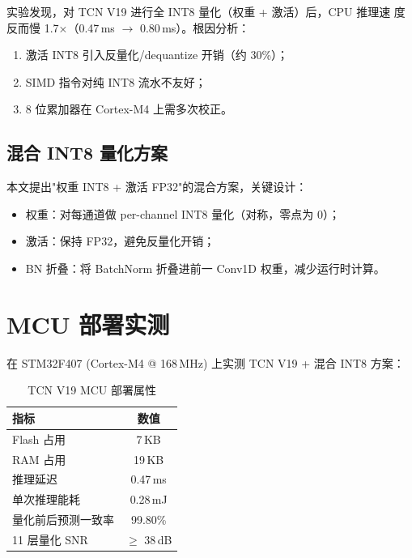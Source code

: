\par 实验发现，对 TCN V19 进行全 INT8 量化（权重 + 激活）后，CPU 推理速
度反而慢 1.7×（0.47\,ms $\to$ 0.80\,ms）。根因分析：
\begin{enumerate}
  \item 激活 INT8 引入反量化/dequantize 开销（约 30\%）；
  \item SIMD 指令对纯 INT8 流水不友好；
  \item 8 位累加器在 Cortex-M4 上需多次校正。
\end{enumerate}

\subsection{混合 INT8 量化方案}
\label{sec:hybrid_int8}

\par 本文提出"权重 INT8 + 激活 FP32"的混合方案，关键设计：
\begin{itemize}
  \item 权重：对每通道做 per-channel INT8 量化（对称，零点为 0）；
  \item 激活：保持 FP32，避免反量化开销；
  \item BN 折叠：将 BatchNorm 折叠进前一 Conv1D 权重，减少运行时计算。
\end{itemize}


\section{MCU 部署实测}
\label{sec:deploy_mcu}

\par 在 STM32F407 (Cortex-M4 @ 168\,MHz) 上实测 TCN V19 + 混合 INT8 方案：

\begin{table}[H]
\centering
\caption{TCN V19 MCU 部署属性}
\label{tab:mcu_deploy}
\begin{tabular}{lc}
\toprule
指标 & 数值 \\
\midrule
Flash 占用 & 7\,KB \\
RAM 占用 & 19\,KB \\
推理延迟 & 0.47\,ms \\
单次推理能耗 & 0.28\,mJ \\
量化前后预测一致率 & 99.80\% \\
11 层量化 SNR & $\geq$ 38\,dB \\
\bottomrule
\end{tabular}
\end{table}

